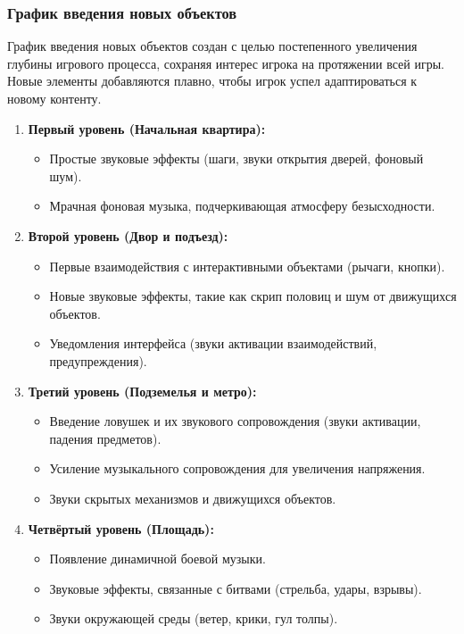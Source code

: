 \documentclass[12pt]{article}
\begin{document}
        \subsubsection{График введения новых объектов}

График введения новых объектов создан с целью постепенного увеличения глубины игрового процесса, сохраняя интерес игрока на протяжении всей игры. Новые элементы добавляются плавно, чтобы игрок успел адаптироваться к новому контенту.

\begin{enumerate}
    \item \textbf{Первый уровень (Начальная квартира):}
    \begin{itemize}
        \item Простые звуковые эффекты (шаги, звуки открытия дверей, фоновый шум).
        \item Мрачная фоновая музыка, подчеркивающая атмосферу безысходности.
    \end{itemize}
    
    \item \textbf{Второй уровень (Двор и подъезд):}
    \begin{itemize}
        \item Первые взаимодействия с интерактивными объектами (рычаги, кнопки).
        \item Новые звуковые эффекты, такие как скрип половиц и шум от движущихся объектов.
        \item Уведомления интерфейса (звуки активации взаимодействий, предупреждения).
    \end{itemize}
    
    \item \textbf{Третий уровень (Подземелья и метро):}
    \begin{itemize}
        \item Введение ловушек и их звукового сопровождения (звуки активации, падения предметов).
        \item Усиление музыкального сопровождения для увеличения напряжения.
        \item Звуки скрытых механизмов и движущихся объектов.
    \end{itemize}
    
    \item \textbf{Четвёртый уровень (Площадь):}
    \begin{itemize}
        \item Появление динамичной боевой музыки.
        \item Звуковые эффекты, связанные с битвами (стрельба, удары, взрывы).
        \item Звуки окружающей среды (ветер, крики, гул толпы).
    \end{itemize}
    

\end{enumerate}
\end{document}
